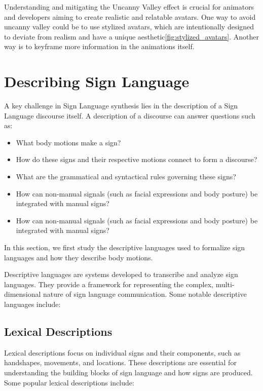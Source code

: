 Understanding and mitigating the Uncanny Valley effect is crucial for animators and developers aiming to create realistic and relatable avatars. One way to avoid uncanny valley could be to use stylized avatars, which are intentionally designed to deviate from realism and have a unique aesthetic\ref{fig:stylized_avatars}. Another way is to keyframe more information in the animations itself.

\section{Describing Sign Language}

A key challenge in Sign Language synthesis lies in the description of a Sign Language discourse itself. A description of a discourse can answer questions such as:

\begin{itemize}
  \item What body motions make a sign?
  \item How do these signs and their respective motions connect to form a discourse?
  \item What are the grammatical and syntactical rules governing these signs?
  \item How can non-manual signals (such as facial expressions and body posture) be integrated with manual signs?
  \item How can non-manual signals (such as facial expressions and body posture) be integrated with manual signs?
\end{itemize}

In this section, we first study the descriptive languages used to formalize sign languages and how they describe body motions.

Descriptive languages are systems developed to transcribe and analyze sign languages. They provide a framework for representing the complex, multi-dimensional nature of sign language communication. Some notable descriptive languages include:

\subsection{Lexical Descriptions}

Lexical descriptions focus on individual signs and their components, such as handshapes, movements, and locations. These descriptions are essential for understanding the building blocks of sign language and how signs are produced. Some popular lexical descriptions include:

